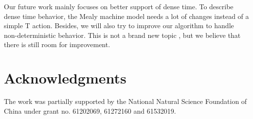 \documentclass[conference, a4paper]{IEEEtran}
\begin{document}
Our future work mainly focuses on better support of dense time. To describe dense
time behavior, the Mealy machine model needs a lot of changes instead of a simple T action. Besides,
we will also try to improve our algorithm to handle non-deterministic behavior. This is not a brand
new topic \cite{DBLP:conf/isola/VolpatoT14}, but we believe that there is still room for
improvement.  

\section*{Acknowledgments}
The work was partially supported by the National Natural Science Foundation of China under grant no.
61202069, 61272160 and 61532019.


\end{document}

